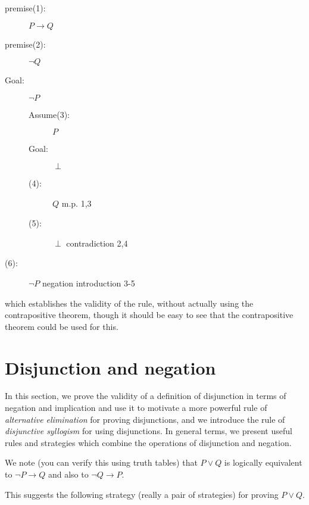\documentclass[12pt]{article}
\begin{document}
\begin{description}

\item[premise(1):]  $P \rightarrow Q$

\item[premise(2):]  $\neg Q$

\item[Goal:]  $\neg P$

\begin{description}

\item[Assume(3):]  $P$

\item[Goal:]  $\perp$

\item[(4):]  $Q$  m.p. 1,3

\item[(5):]  $\perp$ contradiction 2,4

\end{description}

\item[(6):]  $\neg P$  negation introduction 3-5

\end{description}

which establishes the validity of the rule, without actually using the contrapositive theorem, though it should be easy to see that the contrapositive theorem could be used for this.


\newpage

\section{Disjunction and negation}

In this section, we prove the validity of a definition of disjunction in terms of negation and implication and use it to motivate a more powerful rule
of {\em alternative elimination\/} for proving disjunctions, and we introduce the rule of {\em disjunctive syllogism\/} for using disjunctions.  In general terms, we present useful rules and strategies which combine the operations of disjunction and negation.

We note (you can verify this using truth tables) that $P \vee Q$ is logically equivalent to $\neg P \rightarrow Q$ and also to $\neg Q \rightarrow P$.

This suggests the following strategy (really a pair of strategies) for proving $P \vee Q$.
\end{document}
